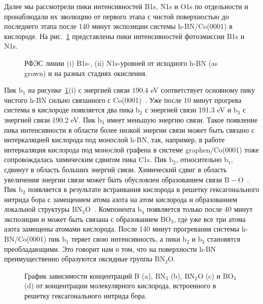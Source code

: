 Далее мы рассмотрели пики интенсивностей B1s, N1s и O1s по отдельности и пронаблюдали их эволюцию
от первого этапа с чистой поверхностью до последнего этапа после 140 минут экспозиции системы h-BN/Co(0001) в кислороде. 
На рис.~\ref{pic:B1s_N1s} представлены пики интенсивностей фотоэмиссии B1s и N1s.
	\begin{figure}[!ht]
		\caption{РФЭС линии (i) B1s-, (ii) N1s-уровней от исходного h-BN (as grown) и на разных стадиях окисления.}
		\label{pic:B1s_N1s}
	\end{figure}
Пик $\mathrm{b_1}$ на рисунке~\ref{pic:B1s_N1s}(i) с энергией связи 190.4 eV соответствует основному пику 
чистого h-BN сильно связанного с Co(0001)~\cite{Usachov2018_h-BN/_PED_STM}. Уже после 10 минут прогрева системы в кислороде появляется два пика
$\mathrm{b_2}$ с энергией связи 191.3 eV и $\mathrm{b_3}$ с энергией связи 190.2 eV. Пик $\mathrm{b_3}$  имеет меньшую энергию связи. Такое появление пика интенсивности в области более низкой энергии связи может быть
связано с интеркаляцией кислорода под монослой h-BN, так, например, в работе~\cite{Usachov2017_Graphen_RS}
интеркаляция кислорода под монослой графена в системе graphen/Co(0001) тоже сопровождалась химическим сдвигом пика C1s. Пик $\mathrm{b_2}$, 
относительно $\mathrm{b_1}$, сдвинут в область больших энергий связи. Химический сдвиг в область увеличения энергии связи может быть обусловлен
образованием связи $\mathrm{B-O}$~\cite{Petravic2010}. Пик $\mathrm{b_2}$ появляется в результате встраивания кислорода
в решетку гексагонального нитрида бора с замещением атома азота на атом кислорода и образованием локальной структуры 
$\mathrm{BN_2O}$~\cite{Makarova2019_h-BN/Ni_Oxydation}.
Компонента $\mathrm{b_4}$ появляется только после 40 минут экспозиции и может
быть связана с образованием $\mathrm{BO_3}$, где уже все три атома азота замещены атомами кислорода. После 140 минут прогревания системы 
h-BN/Co(0001) пик $\mathrm{b_1}$ теряет свою интенсивность, а пики $\mathrm{b_2}$ и $\mathrm{b_3}$ становятся преобладающими. Это говорит 
нам о том, что на поверхности h-BN преимущественно образуются оксидные группы $\mathrm{BN_2O}$.
	\begin{figure}[!ht]
		\caption{График зависимости концентраций B (a), $\mathrm{BN_3}$ (b), $\mathrm{BN_2O}$ (c) и $\mathrm{BO_3}$ (d) от концентрации молекулярного кислорода, встроенного в решетку гексагонального нитрида бора.}
		\label{pic:B_BN3_BN2O_BO3_vs_O}
	\end{figure}


